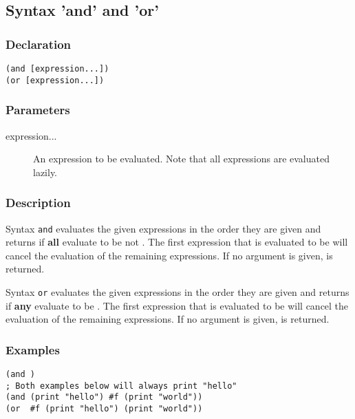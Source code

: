 \subsection{Syntax 'and' and 'or'}
\label{<key>}

\subsubsection*{Declaration}
\begin{lstlisting}
(and [expression...])
(or [expression...])
\end{lstlisting}

\subsubsection*{Parameters}
\begin{description}
	\item[expression...] An expression to be evaluated. Note that all expressions are evaluated lazily.
\end{description}

\subsubsection*{Description}
Syntax \lstinline|and| evaluates the given expressions in the order they are given and returns \true{} if \textbf{all} evaluate to be not \false{}. The first expression that is evaluated to be \false{} will cancel the evaluation of the remaining expressions. If no argument is given, \true{} is returned.

Syntax \lstinline|or| evaluates the given expressions in the order they are given and returns \true if \textbf{any} evaluate to be \true{}. The first expression that is evaluated to be \true{} will cancel the evaluation of the remaining expressions. If no argument is given, \false{} is returned.

\subsubsection*{Examples}
\begin{lstlisting}
(and )
; Both examples below will always print "hello"
(and (print "hello") #f (print "world"))
(or  #f (print "hello") (print "world"))
\end{lstlisting}
